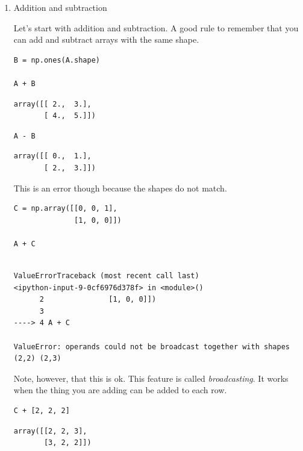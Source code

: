 \documentclass[11pt]{article}
\begin{document}
\begin{enumerate}
\item Addition and subtraction
\label{sec:org0d37ea4}

Let's start with addition and subtraction. A good rule to remember that you can add and subtract arrays with the same shape.

\begin{verbatim}
B = np.ones(A.shape)

A + B
\end{verbatim}

\begin{verbatim}
array([[ 2.,  3.],
       [ 4.,  5.]])
\end{verbatim}

\begin{verbatim}
A - B
\end{verbatim}

\begin{verbatim}
array([[ 0.,  1.],
       [ 2.,  3.]])
\end{verbatim}

This is an error though because the shapes do not match.

\begin{verbatim}
C = np.array([[0, 0, 1],
              [1, 0, 0]])

A + C
\end{verbatim}

\begin{verbatim}

ValueErrorTraceback (most recent call last)
<ipython-input-9-0cf6976d378f> in <module>()
      2               [1, 0, 0]])
      3
----> 4 A + C

ValueError: operands could not be broadcast together with shapes (2,2) (2,3)
\end{verbatim}

Note, however, that this is ok. This feature is called \emph{broadcasting}. It works when the thing you are adding can be added to each row.

\begin{verbatim}
C + [2, 2, 2]
\end{verbatim}

\begin{verbatim}
array([[2, 2, 3],
       [3, 2, 2]])
\end{verbatim}


\end{enumerate}
\end{document}
